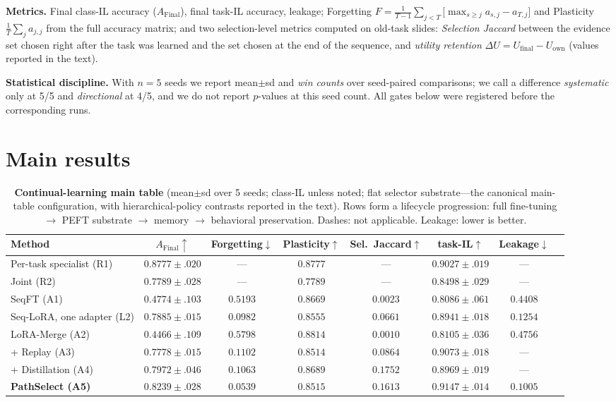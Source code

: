 \documentclass[11pt]{article}
\begin{document}
\textbf{Metrics.} Final class-IL accuracy ($A_{\mathrm{Final}}$), final task-IL accuracy, leakage; Forgetting $F = \frac{1}{T-1}\sum_{j<T}\big[\max_{s\ge j} a_{s,j} - a_{T,j}\big]$ and Plasticity $\frac{1}{T}\sum_j a_{j,j}$ from the full accuracy matrix; and two selection-level metrics computed on old-task slides: \emph{Selection Jaccard} between the evidence set chosen right after the task was learned and the set chosen at the end of the sequence, and \emph{utility retention} $\Delta U = U_{\mathrm{final}} - U_{\mathrm{own}}$ (values reported in the text).

\textbf{Statistical discipline.} With $n{=}5$ seeds we report mean$\pm$sd and \emph{win counts} over seed-paired comparisons; we call a difference \emph{systematic} only at 5/5 and \emph{directional} at 4/5, and we do not report $p$-values at this seed count. All gates below were registered before the corresponding runs.

\section{Main results}\label{sec:results}
\begin{table}[t]
\centering\small
\caption{\textbf{Continual-learning main table} (mean$\pm$sd over 5 seeds; class-IL unless noted; flat selector substrate---the canonical main-table configuration, with hierarchical-policy contrasts reported in the text). Rows form a lifecycle progression: full fine-tuning $\to$ PEFT substrate $\to$ memory $\to$ behavioral preservation. Dashes: not applicable. Leakage: lower is better.}
\label{tab:main}
\begin{tabular}{lccccccc}
\toprule
Method & $A_{\mathrm{Final}}\!\uparrow$ & Forgetting$\downarrow$ & Plasticity$\uparrow$ & Sel.\ Jaccard$\uparrow$ & task-IL$\uparrow$ & Leakage$\downarrow$ \\
\midrule
Per-task specialist (R1) & $0.8777{\pm}.020$ & --- & $0.8777$ & --- & $0.9027{\pm}.019$ & --- \\
Joint (R2) & $0.7789{\pm}.028$ & --- & $0.7789$ & --- & $0.8498{\pm}.029$ & --- \\
\midrule
SeqFT (A1) & $0.4774{\pm}.103$ & $0.5193$ & $0.8669$ & $0.0023$ & $0.8086{\pm}.061$ & $0.4408$ \\
Seq-LoRA, one adapter (L2) & $0.7885{\pm}.015$ & $0.0982$ & $0.8555$ & $0.0661$ & $0.8941{\pm}.018$ & $0.1254$ \\
LoRA-Merge (A2) & $0.4466{\pm}.109$ & $0.5798$ & $0.8814$ & $0.0010$ & $0.8105{\pm}.036$ & $0.4756$ \\
\;+ Replay (A3) & $0.7778{\pm}.015$ & $0.1102$ & $0.8514$ & $0.0864$ & $0.9073{\pm}.018$ & --- \\
\;+ Distillation (A4) & $0.7972{\pm}.046$ & $0.1063$ & $0.8689$ & $0.1752$ & $0.8969{\pm}.019$ & --- \\
\textbf{PathSelect (A5)} & $\mathbf{0.8239{\pm}.028}$ & $\mathbf{0.0539}$ & $0.8515$ & $0.1613$ & $\mathbf{0.9147{\pm}.014}$ & $\mathbf{0.1005}$ \\
\bottomrule
\end{tabular}
\end{table}
\end{document}
